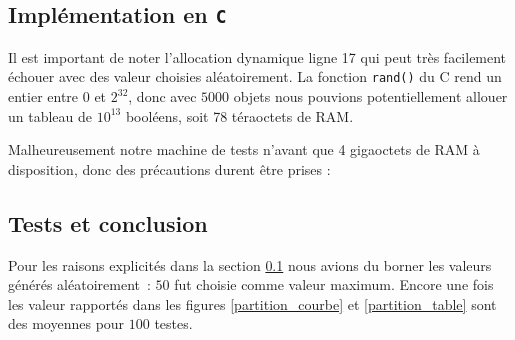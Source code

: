 \subsection{Implémentation en \texttt{C}}
\label{implementation_c}
Il est important de noter l'allocation dynamique ligne 17 qui peut très facilement échouer avec des valeur choisies aléatoirement. La fonction \texttt{rand()} du C rend un entier entre $0$ et $2^{32}$, donc avec $5000$ objets nous pouvions potentiellement allouer un tableau de $10^{13}$ booléens, soit 78 téraoctets de RAM.

Malheureusement notre machine de tests n'avant que 4 gigaoctets de RAM à disposition, donc des précautions durent être prises :

\vspace{0.5cm}

 

\subsection{Tests et conclusion}

Pour les raisons explicités dans la section \ref{implementation_c} nous avions du borner les valeurs générés aléatoirement~: $50$ fut choisie comme valeur maximum. Encore une fois les valeur rapportés dans les figures \ref{partition_courbe} et \ref{partition_table} sont des moyennes pour $100$ testes.

